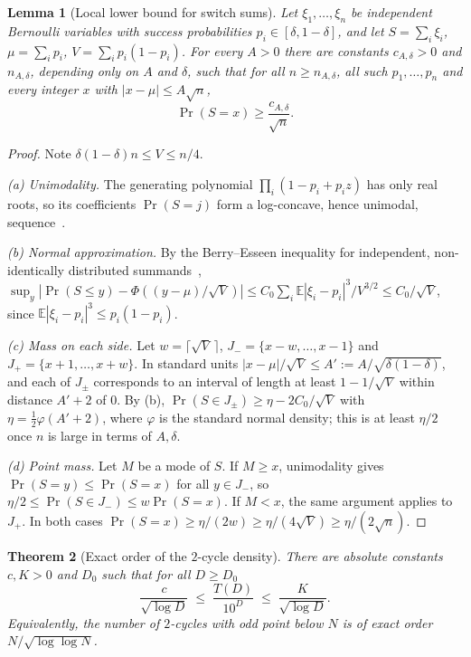 \documentclass[11pt]{article}
\newtheorem{theorem}{Theorem}[section]
\newtheorem{lemma}[theorem]{Lemma}
\theoremstyle{definition}
\theoremstyle{remark}
\begin{document}
\begin{lemma}[Local lower bound for switch sums]\label{lem:llt}
Let $\xi_1,\dots,\xi_n$ be independent Bernoulli variables with success
probabilities $p_i\in[\delta,1-\delta]$, and let $S=\sum_i\xi_i$,
$\mu=\sum_ip_i$, $V=\sum_ip_i(1-p_i)$. For every $A>0$ there are constants
$c_{A,\delta}>0$ and $n_{A,\delta}$, depending only on $A$ and $\delta$, such
that for all $n\ge n_{A,\delta}$, all such $p_1,\dots,p_n$ and every integer
$x$ with $|x-\mu|\le A\sqrt n$,
\[
  \Pr(S=x)\ge\frac{c_{A,\delta}}{\sqrt n}.
\]
\end{lemma}

\begin{proof}
Note $\delta(1-\delta)n\le V\le n/4$.

\emph{(a) Unimodality.} The generating polynomial
$\prod_i(1-p_i+p_iz)$ has only real roots, so its coefficients
$\Pr(S=j)$ form a log-concave, hence unimodal, sequence~\cite{Hoggar}.

\emph{(b) Normal approximation.} By the Berry--Esseen inequality for
independent, non-identically distributed summands~\cite{Petrov},
$\sup_y|\Pr(S\le y)-\Phi((y-\mu)/\sqrt V)|\le C_0\sum_i\mathbb E|\xi_i-p_i|^3/V^{3/2}
\le C_0/\sqrt V$, since $\mathbb E|\xi_i-p_i|^3\le p_i(1-p_i)$.

\emph{(c) Mass on each side.} Let $w=\lceil\sqrt V\,\rceil$,
$J_-=\{x-w,\dots,x-1\}$ and $J_+=\{x+1,\dots,x+w\}$. In standard units
$|x-\mu|/\sqrt V\le A':=A/\sqrt{\delta(1-\delta)}$, and each of $J_\pm$
corresponds to an interval of length at least $1-1/\sqrt V$ within distance
$A'+2$ of $0$. By (b), $\Pr(S\in J_\pm)\ge\eta-2C_0/\sqrt V$ with
$\eta=\tfrac12\varphi(A'+2)$, where $\varphi$ is the standard normal density;
this is at least $\eta/2$ once $n$ is large in terms of $A,\delta$.

\emph{(d) Point mass.} Let $M$ be a mode of $S$. If $M\ge x$, unimodality gives
$\Pr(S=y)\le\Pr(S=x)$ for all $y\in J_-$, so
$\eta/2\le\Pr(S\in J_-)\le w\Pr(S=x)$. If $M<x$, the same argument applies to
$J_+$. In both cases $\Pr(S=x)\ge\eta/(2w)\ge\eta/(4\sqrt V)\ge\eta/(2\sqrt n)$.
\end{proof}

\begin{theorem}[Exact order of the $2$-cycle density]\label{thm:sharp}
There are absolute constants $c,K>0$ and $D_0$ such that for all $D\ge D_0$
\[
  \frac{c}{\sqrt{\log D}}\;\le\;\frac{T(D)}{10^D}\;\le\;\frac{K}{\sqrt{\log D}} .
\]
Equivalently, the number of $2$-cycles with odd point below $N$ is of exact
order $N/\sqrt{\log\log N}$.
\end{theorem}
\end{document}
